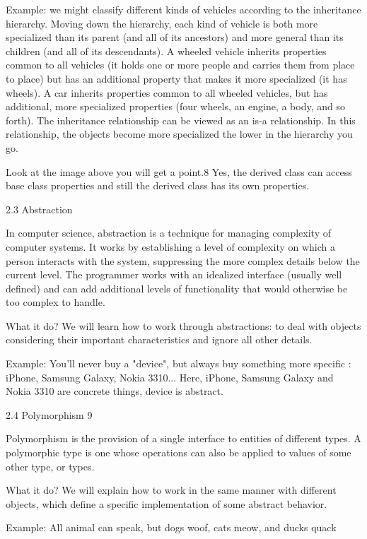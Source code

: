 Example: we might classify different kinds of vehicles according to the inheritance hierarchy. Moving down the hierarchy, each kind of vehicle is both more specialized than its parent (and all of its ancestors) and more general than its children (and all of its descendants). A wheeled vehicle inherits properties common to all vehicles (it holds one or more people and carries them from place to place) but has an additional property that makes it more specialized (it has wheels). A car inherits properties common to all wheeled vehicles, but has additional, more specialized properties (four wheels, an engine, a body, and so forth). The inheritance relationship can be viewed as an is-a relationship. In this relationship, the objects become more specialized the lower in the hierarchy you go.



Look at the image above you will get a point.8 Yes, the derived class can access base class properties and still the derived class has its own properties.

2.3 Abstraction

In computer science, abstraction is a technique for managing complexity of computer systems. It works by establishing a level of complexity on which a person interacts with the system, suppressing the more complex details below the current level. The programmer works with an idealized interface (usually well defined) and can add additional levels of functionality that would otherwise be too complex to handle.

What it do? We will learn how to work through abstractions: to deal with objects considering their important characteristics and ignore all other details.



Example: You'll never buy a "device", but always buy something more specific : iPhone, Samsung Galaxy, Nokia 3310... Here, iPhone, Samsung Galaxy and Nokia 3310 are concrete things, device is abstract.

2.4 Polymorphism 9

Polymorphism is the provision of a single interface to entities of different types. A polymorphic type is one whose operations can also be applied to values of some other type, or types.

What it do? We will explain how to work in the same manner with different objects, which define a specific implementation of some abstract behavior.



Example: All animal can speak, but dogs woof, cats meow, and ducks quack

